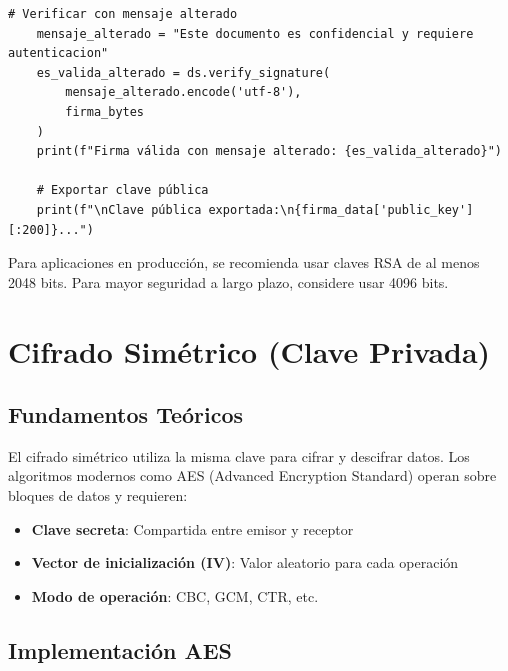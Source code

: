 \documentclass[12pt,a4paper]{article}
\begin{document}
\begin{lstlisting}[caption=Implementación de firma digital con RSA]
    # Verificar con mensaje alterado
    mensaje_alterado = "Este documento es confidencial y requiere autenticacion"
    es_valida_alterado = ds.verify_signature(
        mensaje_alterado.encode('utf-8'), 
        firma_bytes
    )
    print(f"Firma válida con mensaje alterado: {es_valida_alterado}")
    
    # Exportar clave pública
    print(f"\nClave pública exportada:\n{firma_data['public_key'][:200]}...")
\end{lstlisting}

\begin{securitygoodpractice}
	Para aplicaciones en producción, se recomienda usar claves RSA de al menos 2048 bits. Para mayor seguridad a largo plazo, considere usar 4096 bits.
\end{securitygoodpractice}

\newpage

\section{Cifrado Simétrico (Clave Privada)}

\subsection{Fundamentos Teóricos}

El cifrado simétrico utiliza la misma clave para cifrar y descifrar datos. Los
algoritmos modernos como AES (Advanced Encryption Standard) operan sobre
bloques de datos y requieren:

\begin{itemize}
	\item \textbf{Clave secreta}: Compartida entre emisor y receptor
	\item \textbf{Vector de inicialización (IV)}: Valor aleatorio para cada operación
	\item \textbf{Modo de operación}: CBC, GCM, CTR, etc.
\end{itemize}

\subsection{Implementación AES}
\end{document}
